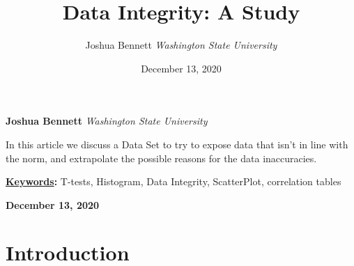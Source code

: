 \documentclass[]{article}
\title{\textbf{\textcolor{WSU.crimson}{Data Integrity: A Study}}  }
\author{\Large Joshua
Bennett\vspace{0.05in} \newline\normalsize\emph{Washington State
University}  }
\date{December 13, 2020}
\newcommand*{\authorfont}{\fontfamily{phv}\selectfont}
\renewenvironment{abstract}
 {{%
    \setlength{\leftmargin}{0mm}
    \setlength{\rightmargin}{\leftmargin}%
  }%
  \relax}
 {\endlist}
\begin{document}
	
%    


{%
\setlength{\parindent}{0pt}
\thispagestyle{plain}
{\fontsize{18}{20}\selectfont\raggedright 
\maketitle  %

}

{
   \vskip 13.5pt\relax \normalsize\fontsize{11}{12} 
   
\textbf{\authorfont Joshua Bennett} \hskip 15pt \emph{\small Washington
State University}   

}

}








\begin{abstract}

    \hbox{\vrule height .2pt width 39.14pc}

    \vskip 8.5pt %

\noindent In this article we discuss a Data Set to try to expose data
that isn't in line with the norm, and extrapolate the possible reasons
for the data inaccuracies.


\vskip 8.5pt \noindent \textbf{\underline{Keywords}:} T-tests,
Histogram, Data Integrity, ScatterPlot, correlation tables \par

    




    
    \hbox{\vrule height .2pt width 39.14pc}
    \vskip 5pt 
    \hfill \textbf{\textcolor{WSU.gray}{ December 13, 2020 } }
    \vskip 5pt 
    
\end{abstract}


\vskip -8.5pt




\noindent  

\section{Introduction}
\label{sec:intro}
\end{document}
